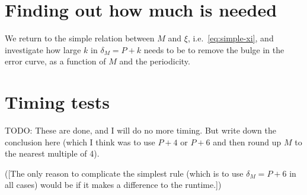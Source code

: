 \documentclass[a4paper,10pt]{article}
\begin{document}
\section{Finding out how much is needed}

We return to the simple relation between $M$ and $\xi$, i.e.\
\eqref{eq:simple-xi}, and investigate how large $k$ in $\delta_M
= P+k$ needs to be to remove the bulge in the error curve, as a
function of $M$ and the periodicity.

\section{Timing tests}

TODO: These are done, and I will do no more timing. But write
down the conclusion here (which I think was to use $P+4$ or $P+6$
and then round up $M$ to the nearest multiple of 4).

([The only reason to complicate the simplest rule (which is to use
$\delta_M = P+6$ in all cases) would be if it makes a difference
to the runtime.])
\end{document}
